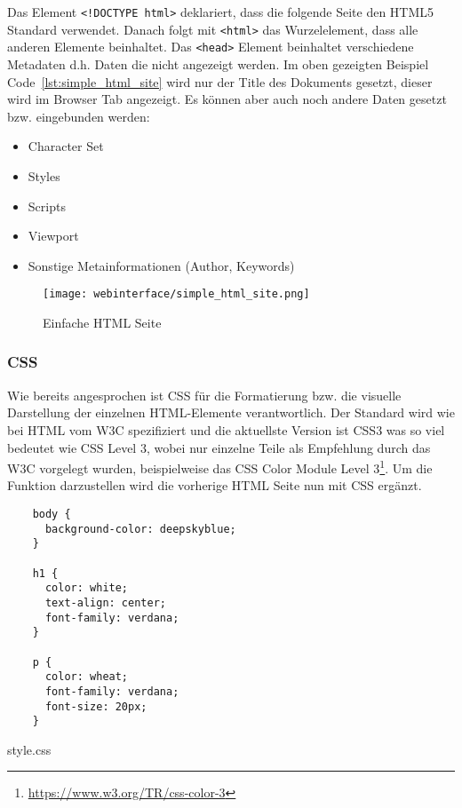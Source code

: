 Das Element \verb|<!DOCTYPE html>| deklariert, dass die folgende Seite den HTML5
Standard verwendet. Danach folgt mit \verb|<html>| das Wurzelelement, dass alle
anderen Elemente beinhaltet. Das \verb|<head>| Element beinhaltet verschiedene
Metadaten d.h. Daten die nicht angezeigt werden. Im oben gezeigten Beispiel
Code~\ref{lst:simple_html_site} wird nur der Title des Dokuments gesetzt, dieser
wird im Browser Tab angezeigt. Es können aber auch noch andere Daten gesetzt
bzw. eingebunden werden:

\begin{itemize}
  \item Character Set
  \item Styles
  \item Scripts
  \item Viewport
  \item Sonstige Metainformationen (Author, Keywords)
\end{itemize}

\begin{figure}[H]
  \centering
  \texttt{[image: webinterface/simple\_html\_site.png]}
  \caption{Einfache HTML Seite}
\end{figure}

\subsubsection{CSS}
Wie bereits angesprochen ist \ac*{CSS} für die Formatierung bzw. die visuelle
Darstellung der einzelnen HTML-Elemente verantwortlich. Der Standard wird wie
bei HTML vom \acs*{W3C} spezifiziert und die aktuellste Version ist CSS3 was so
viel bedeutet wie \acs*{CSS} Level 3, wobei nur einzelne Teile als Empfehlung
durch das \acs*{W3C} vorgelegt wurden, beispielweise das CSS Color Module Level
3\footnote{\url{https://www.w3.org/TR/css-color-3}}. Um die Funktion
darzustellen wird die vorherige HTML Seite nun mit CSS ergänzt.

\begin{listing}[H]
  \begin{verbatim}
    body {
      background-color: deepskyblue;
    }

    h1 {
      color: white;
      text-align: center;
      font-family: verdana;
    }

    p {
      color: wheat;
      font-family: verdana;
      font-size: 20px;
    }
  \end{verbatim}
  \caption{style.css}
\end{listing}

